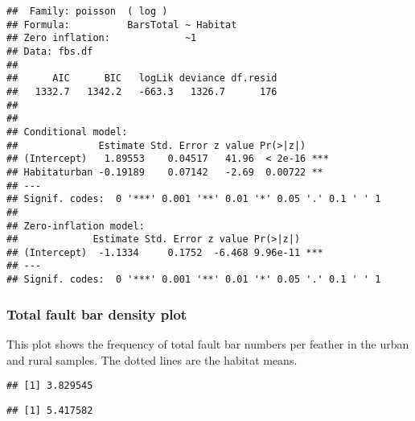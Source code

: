 \documentclass[
]{article}
\newenvironment{Shaded}{\begin{snugshade}}{\end{snugshade}}
\newcommand{\FunctionTok}[1]{\textcolor[rgb]{0.13,0.29,0.53}{\textbf{#1}}}
\newcommand{\NormalTok}[1]{#1}
\newcommand{\SpecialCharTok}[1]{\textcolor[rgb]{0.81,0.36,0.00}{\textbf{#1}}}
\newcommand{\StringTok}[1]{\textcolor[rgb]{0.31,0.60,0.02}{#1}}
\begin{document}
\begin{verbatim}
##  Family: poisson  ( log )
## Formula:          BarsTotal ~ Habitat
## Zero inflation:             ~1
## Data: fbs.df
## 
##      AIC      BIC   logLik deviance df.resid 
##   1332.7   1342.2   -663.3   1326.7      176 
## 
## 
## Conditional model:
##              Estimate Std. Error z value Pr(>|z|)    
## (Intercept)   1.89553    0.04517   41.96  < 2e-16 ***
## Habitaturban -0.19189    0.07142   -2.69  0.00722 ** 
## ---
## Signif. codes:  0 '***' 0.001 '**' 0.01 '*' 0.05 '.' 0.1 ' ' 1
## 
## Zero-inflation model:
##             Estimate Std. Error z value Pr(>|z|)    
## (Intercept)  -1.1334     0.1752  -6.468 9.96e-11 ***
## ---
## Signif. codes:  0 '***' 0.001 '**' 0.01 '*' 0.05 '.' 0.1 ' ' 1
\end{verbatim}

\subsubsection{Total fault bar density
plot}\label{total-fault-bar-density-plot}

This plot shows the frequency of total fault bar numbers per feather in
the urban and rural samples. The dotted lines are the habitat means.

\begin{Shaded}
\end{Shaded}

\begin{verbatim}
## [1] 3.829545
\end{verbatim}

\begin{Shaded}
\end{Shaded}

\begin{verbatim}
## [1] 5.417582
\end{verbatim}
\end{document}
